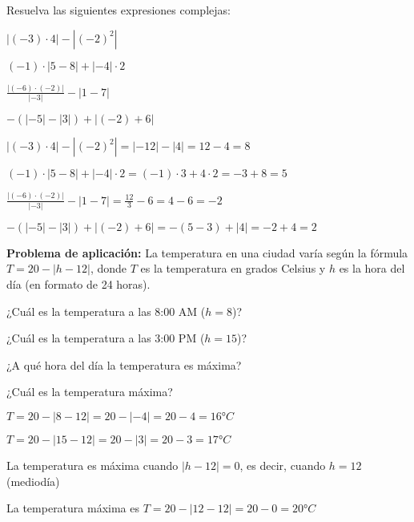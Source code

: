 \begin{exercise}
\problem Resuelva las siguientes expresiones complejas:

\begin{exerciselist}
    \item $|(-3) \cdot 4| - |(-2)^2|$
    \item $(-1) \cdot |5 - 8| + |-4| \cdot 2$
    \item $\frac{|(-6) \cdot (-2)|}{|-3|} - |1 - 7|$
    \item $-(|-5| - |3|) + |(-2) + 6|$
\end{exerciselist}

\begin{solucion}
\begin{exerciselist}
    \item $|(-3) \cdot 4| - |(-2)^2| = |-12| - |4| = 12 - 4 = 8$
    \item $(-1) \cdot |5 - 8| + |-4| \cdot 2 = (-1) \cdot 3 + 4 \cdot 2 = -3 + 8 = 5$
    \item $\frac{|(-6) \cdot (-2)|}{|-3|} - |1 - 7| = \frac{12}{3} - 6 = 4 - 6 = -2$
    \item $-(|-5| - |3|) + |(-2) + 6| = -(5 - 3) + |4| = -2 + 4 = 2$
\end{exerciselist}
\end{solucion}
\end{exercise}

\begin{exercise}
\problem \textbf{Problema de aplicación:} La temperatura en una ciudad varía según la fórmula $T = 20 - |h - 12|$, donde $T$ es la temperatura en grados Celsius y $h$ es la hora del día (en formato de 24 horas).

\begin{exerciselist}
    \item ¿Cuál es la temperatura a las 8:00 AM ($h = 8$)?
    \item ¿Cuál es la temperatura a las 3:00 PM ($h = 15$)?
    \item ¿A qué hora del día la temperatura es máxima?
    \item ¿Cuál es la temperatura máxima?
\end{exerciselist}

\begin{solucion}
\begin{exerciselist}
    \item $T = 20 - |8 - 12| = 20 - |-4| = 20 - 4 = 16°C$
    \item $T = 20 - |15 - 12| = 20 - |3| = 20 - 3 = 17°C$
    \item La temperatura es máxima cuando $|h - 12| = 0$, es decir, cuando $h = 12$ (mediodía)
    \item La temperatura máxima es $T = 20 - |12 - 12| = 20 - 0 = 20°C$
\end{exerciselist}
\end{solucion}
\end{exercise}